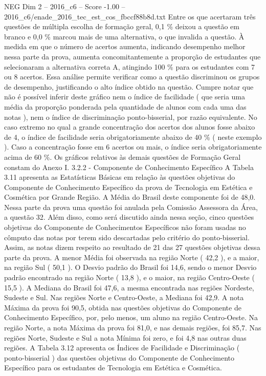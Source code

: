 \begin{textsample}{NEG Dim 2 – 2016\_c6 – Score -1.00 – 2016\_c6/enade\_2016\_tec\_est\_cos\_fbccf88b8d.txt}
Entre os que acertaram três questões de múltipla escolha de formação geral, 0,1 \% deixou a questão em branco e 0,0 \% marcou mais de uma alternativa, o que invalida a questão.
À medida em que o número de acertos aumenta, indicando desempenho melhor nessa parte da prova, aumenta concomitantemente a proporção de estudantes que selecionaram a alternativa correta A, atingindo 100 \% para os estudantes com 7 ou 8 acertos.
Essa análise permite verificar como a questão discriminou os grupos de desempenho, justificando o alto índice obtido na questão.
Cumpre notar que não é possível inferir deste gráfico nem o índice de facilidade ( que seria uma média da proporção ponderada pela quantidade de alunos com cada uma das notas ), nem o índice de discriminação ponto-bisserial, por razão equivalente.
No caso extremo no qual a grande concentração dos acertos dos alunos fosse abaixo de 4, o índice de facilidade seria obrigatoriamente abaixo de 40 \% ( neste exemplo ).
Caso a concentração fosse em 6 acertos ou mais, o índice seria obrigatoriamente acima de 60 \%.
Os gráficos relativos às demais questões de Formação Geral constam do Anexo I. 3.2.2 - Componente de Conhecimento Específico A Tabela 3.11 apresenta as Estatísticas Básicas em relação às questões objetivas do Componente de Conhecimento Específico da prova de Tecnologia em Estética e Cosmética por Grande Região.
A Média do Brasil deste componente foi de 48,0.
Nessa parte da prova uma questão foi anulada pela Comissão Assessora da Área, a questão 32.
Além disso, como será discutido ainda nessa seção, cinco questões objetivas do Componente de Conhecimentos Específicos não foram usadas no cômputo das notas por terem sido descartadas pelo critério do ponto-bisserial.
Assim, as notas dizem respeito ao resultado de 21 das 27 questões objetivas dessa parte da prova.
A menor Média foi observada na região Norte ( 42,2 ), e a maior, na região Sul ( 50,1 ).
O Desvio padrão do Brasil foi 14,6, sendo o menor Desvio padrão encontrado na região Norte ( 13,8 ), e o maior, na região Centro-Oeste ( 15,5 ).
A Mediana do Brasil foi 47,6, a mesma encontrada nas regiões Nordeste, Sudeste e Sul.
Nas regiões Norte e Centro-Oeste, a Mediana foi 42,9.
A nota Máxima da prova foi 90,5, obtida nas questões objetivas do Componente de Conhecimento Específico, por, pelo menos, um aluno na região Centro-Oeste.
Na região Norte, a nota Máxima da prova foi 81,0, e nas demais regiões, foi 85,7.
Nas regiões Norte, Sudeste e Sul a nota Mínima foi zero, e foi 4,8 nas outras duas regiões.
A Tabela 3.12 apresenta os Índices de Facilidade e Discriminação ( ponto-bisserial ) das questões objetivas do Componente de Conhecimento Específico para os estudantes de Tecnologia em Estética e Cosmética.

\end{textsample}
